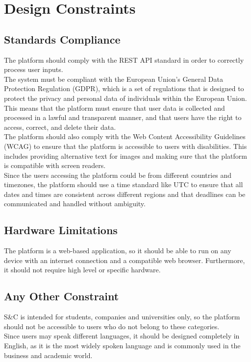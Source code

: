 \section{Design Constraints}

\subsection{Standards Compliance}
The platform should comply with the REST API standard in order to correctly process user inputs. \\
The system must be compliant with the European Union's General Data Protection Regulation (GDPR), which is a set of regulations that is designed
to protect the privacy and personal data of individuals within the European Union. This means that the platform must ensure that user data is
collected and processed in a lawful and transparent manner, and that users have the right to access, correct, and delete their data. \\
The platform should also comply with the Web Content Accessibility Guidelines (WCAG) to ensure that the platform is accessible to users with
disabilities. This includes providing alternative text for images and making sure that the platform is compatible with screen readers. \\
Since the users accessing the platform could be from different countries and timezones, the platform should use a time standard like UTC to
ensure that all dates and times are consistent across different regions and that deadlines can be communicated and handled without ambiguity.

\subsection{Hardware Limitations}
The platform is a web-based application, so it should be able to run on any device with an internet connection and a compatible web browser. 
Furthermore, it should not require high level or specific hardware.

\subsection{Any Other Constraint}
S\&C is intended for students, companies and universities only, so the platform should not be accessible to users who do not belong to these
categories. \\
Since users may speak different languages, it should be designed completely in English, as it is the most widely spoken language and is commonly 
used in the business and academic world.




